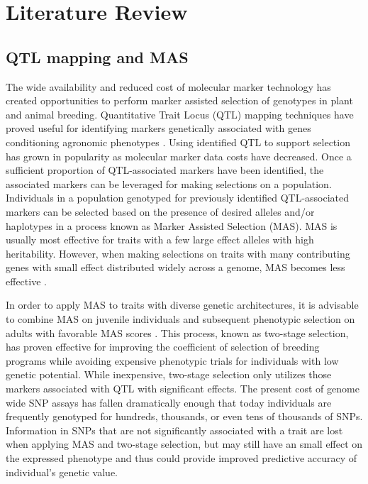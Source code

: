 \section{Literature Review} \label{sec:lit-review}

\subsection*{QTL mapping and MAS}

The wide availability and reduced cost of molecular marker technology
has created opportunities to perform marker assisted selection of genotypes
in plant and animal breeding. Quantitative Trait Locus (QTL) mapping techniques
have proved useful for identifying markers genetically associated with genes 
conditioning agronomic phenotypes \citep{miles2008}. Using identified QTL to
support selection has grown in popularity as molecular marker data costs have 
decreased. Once a sufficient proportion of QTL-associated markers have been identified, 
the associated markers can be leveraged for making selections on a population. 
Individuals in a population genotyped for previously identified QTL-associated
markers can be selected based on the presence of desired alleles 
and/or haplotypes in a process known as Marker Assisted Selection (MAS).
MAS is usually most effective for traits with a few large effect alleles with high 
heritability. However, when making selections on traits with many contributing genes
with small effect distributed widely across a genome, MAS becomes less 
effective \citep{heffner2009}.

In order to apply MAS to traits with diverse genetic architectures, it is
advisable to combine MAS on juvenile individuals and subsequent phenotypic
selection on adults with favorable MAS scores \citep{lande1990}. This process, 
known as two-stage selection, has proven effective for improving
the coefficient of selection of breeding programs while avoiding expensive phenotypic
trials for individuals with low genetic potential. While inexpensive, two-stage selection 
only utilizes those markers associated with QTL with significant effects. The present cost of
genome wide SNP assays has fallen dramatically enough that today individuals are
frequently genotyped for hundreds, thousands, or even tens of thousands of SNPs. 
Information in SNPs that are not significantly associated with a trait are lost 
when applying MAS and two-stage selection, but may still have an small effect on the
expressed phenotype and thus could provide improved predictive 
accuracy of individual's genetic value.

